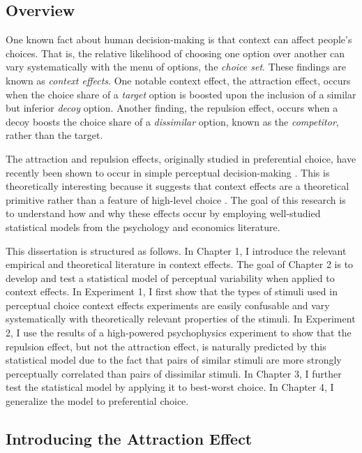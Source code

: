 \subsection{Overview}

One known fact about human decision-making is that context can affect people's choices. That is, the relative likelihood of choosing one option over another can vary systematically with the menu of options, the \textit{choice set}. These findings are known as \textit{context effects}. One notable context effect, the attraction effect, occurs when the choice share of a \textit{target} option is boosted upon the inclusion of a similar but inferior \textit{decoy} option. Another finding, the repulsion effect, occurs when a decoy boosts the choice share of a \textit{dissimilar} option, known as the \textit{competitor}, rather than the target.

The attraction and repulsion effects, originally studied in preferential choice, have recently been shown to occur in simple perceptual decision-making \parencite{trueblood2013not,spektorWhenGoodLooks2018b}. This is theoretically interesting because it suggests that context effects are a theoretical primitive rather than a feature of high-level choice \parencite{trueblood2013not}. The goal of this research is to understand how and why these effects occur by employing well-studied statistical models from the psychology and economics literature. 

This dissertation is structured as follows. In Chapter 1, I introduce the relevant empirical and theoretical literature in context effects. The goal of Chapter 2 is to develop and test a statistical model of perceptual variability when applied to context effects. In Experiment 1, I first show that the types of stimuli used in perceptual choice context effects experiments are easily confusable and vary systematically with theoretically relevant properties of the stimuli. In Experiment 2, I use the results of a high-powered psychophysics experiment to show that the repulsion effect, but not the attraction effect, is naturally predicted by this statistical model due to the fact that pairs of similar stimuli are more strongly perceptually correlated than pairs of dissimilar stimuli. In Chapter 3, I further test the statistical model by applying it to best-worst choice. In Chapter 4, I generalize the model to preferential choice. 

\subsection{Introducing the Attraction Effect}

